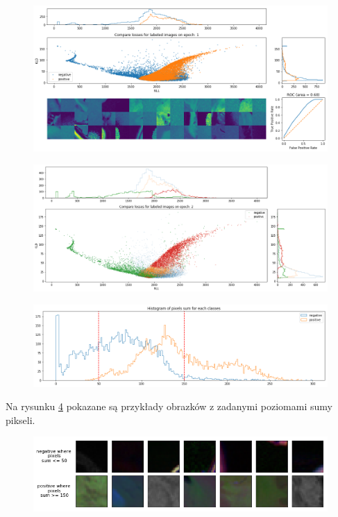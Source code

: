 \begin{figure}[h!]
    \centering
    \includegraphics[width=1.0\textwidth]{images/soft_vae}
    \caption{}
    \label{fig:soft_vae}
\end{figure}

\begin{figure}[h!]
    \centering
    \includegraphics[width=1.0\textwidth]{images/soft_vae_th}
    \caption{}
    \label{fig:soft_vae_th}
\end{figure}

\begin{figure}[h!]
    \centering
    \includegraphics[width=1.0\textwidth]{images/pixels_hist}
    \caption{}
    \label{fig:pixels_hist}
\end{figure}

Na rysunku \ref{fig:pixels_sum_examples} pokazane są przykłady obrazków z zadanymi poziomami sumy pikseli. 

\begin{figure}[h!]
    \centering
    \includegraphics[width=1.0\textwidth]{images/pixels_sum_examples}
    \caption{}
    \label{fig:pixels_sum_examples}
\end{figure}

